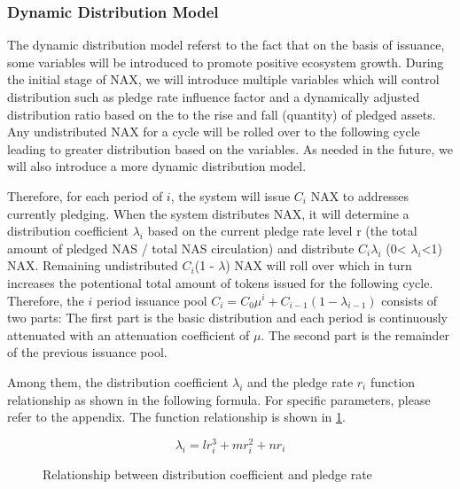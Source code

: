 \subsubsection{Dynamic Distribution Model}
The dynamic distribution model referst to the fact that on the basis of issuance, some variables will be introduced to promote positive ecosystem growth. During the initial stage of NAX, we will introduce multiple variables which will control distribution such as pledge rate influence factor and a dynamically adjusted  distribution ratio based on the to the rise and fall (quantity) of pledged assets. Any undistributed NAX for a cycle will be rolled over to the following cycle leading to greater distribution based on the variables. As needed in the future, we will also introduce a more dynamic distribution model.

Therefore, for each period of $i$, the system will issue $C_i$ NAX to addresses currently pledging. When the system distributes NAX, it will determine a distribution coefficient $\lambda_i$ based on the current pledge rate level r (the total amount of pledged NAS / total NAS circulation) and distribute $C_i$$\lambda_i$ (0< $\lambda_i$<1) NAX. Remaining undistributed $C_i$(1 - $\lambda$) NAX will roll over which in turn increases the potentional total amount of tokens issued for the following cycle. Therefore, the \(i\) period issuance pool \(C_i = C_0 \mu^i + C_{i-1} (1-\lambda_{i-1})\) consists of two parts: The first part is the basic distribution and each period is continuously attenuated with an attenuation coefficient of $\mu$. The second part is the remainder of the previous issuance pool.

Among them, the distribution coefficient \(\lambda_i\) and the pledge rate \(r_i\) function relationship as shown in the following formula. For specific parameters, please refer to the appendix. The function relationship is shown in \ref{func}.

  \begin{equation}
    \lambda_i = l r_i^3 + m r_i^2 + n r_i
  \end{equation}

\begin{figure}
\centering
    \caption{Relationship between distribution coefficient and pledge rate}\label{func}
\end{figure}




